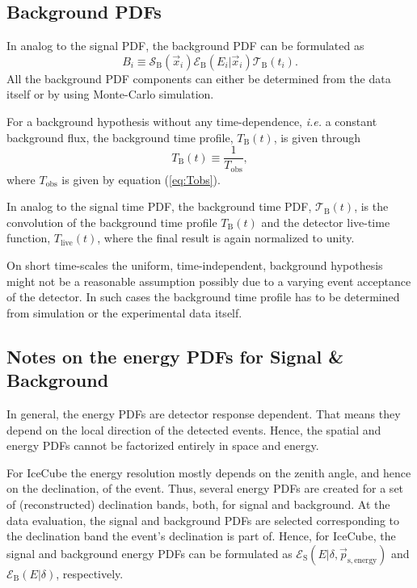 \documentclass{article}
\begin{document}
\subsection{Background PDFs}

In analog to the signal PDF, the background PDF can be formulated as
\begin{equation}
 B_i \equiv \mathcal{S}_{\mathrm{B}}(\vec{x}_i) \mathcal{E}_{\mathrm{B}}(E_i|\vec{x}_i) \mathcal{T}_{\mathrm{B}}(t_i).
 \label{eq:Bi}
\end{equation}
All the background PDF components can either be determined from the data itself
or by using Monte-Carlo simulation.

For a background hypothesis without any time-dependence, \emph{i.e.} a constant
background flux, the background time profile,
$T_{\mathrm{B}}(t)$, is given through
\begin{equation}
 T_{\mathrm{B}}(t) \equiv \frac{1}{T_{\mathrm{obs}}},
\end{equation}
where $T_{\mathrm{obs}}$ is given by equation (\ref{eq:Tobs}).

In analog to the signal time PDF, the background time PDF, $\mathcal{T}_{\mathrm{B}}(t)$,
is the convolution of the background time profile $T_{\mathrm{B}}(t)$ and the
detector live-time function, $T_{\mathrm{live}}(t)$, where the final result is
again normalized to unity.

On short time-scales the uniform, time-independent, background hypothesis might
not be a reasonable assumption possibly due to a varying event acceptance of the
detector. In such cases the background time profile has to be determined from
simulation or the experimental data itself.


\subsection{Notes on the energy PDFs for Signal \& Background}

In general, the energy PDFs are detector response dependent. That means they
depend on the local direction of the detected events. Hence, the spatial and
energy PDFs cannot be factorized entirely in space and energy.

For IceCube the energy resolution mostly depends on the zenith angle, and hence
on the declination, of the event. Thus, several energy PDFs are created for a
set of (reconstructed) declination bands, both, for signal and background. At
the data evaluation, the signal and background PDFs are selected corresponding
to the declination band the event's declination is part of. Hence, for IceCube,
the signal and background energy PDFs can be formulated as
$\mathcal{E}_{\mathrm{S}}(E|\delta,\vec{p}_{\mathrm{s,energy}})$ and
$\mathcal{E}_{\mathrm{B}}(E|\delta)$, respectively.
\end{document}
